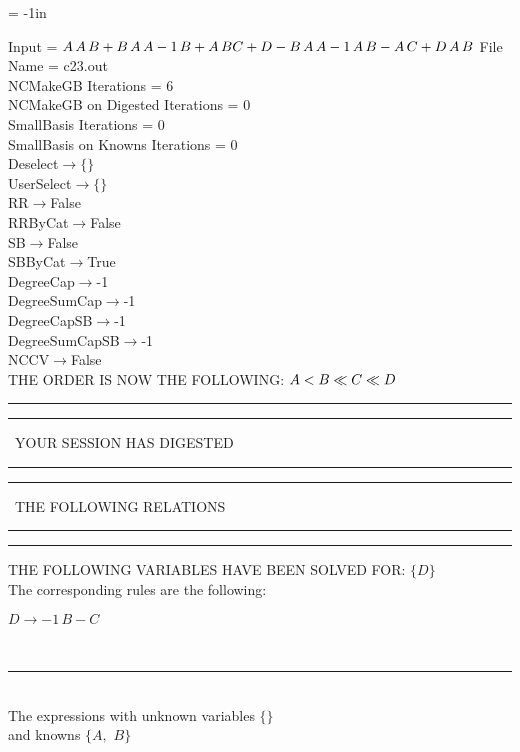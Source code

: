 \voffset = -1in
\evensidemargin 0.1in
\oddsidemargin 0.1in
\textheight 9in
\textwidth 6in

\normalsize
\baselineskip=12pt
\noindent
Input = 
$
\\A\,
 A\,
 B + B\,
 A\,
 A\\
-1\,
 B + A\,
 B\\
C + D - B\,
 A\,
 A\\
-1\,
 A\,
 B - A\,
 C + D\,
 A\,
 B\\
$
File Name = c23.out\\
NCMakeGB Iterations = 6\\
NCMakeGB on Digested Iterations = 0\\
SmallBasis Iterations = 0\\
SmallBasis on Knowns Iterations = 0\\
Deselect$\rightarrow \{\}$\\
UserSelect$\rightarrow \{\}$\\
RR$\rightarrow $False\\
RRByCat$\rightarrow $False\\
SB$\rightarrow $False\\
SBByCat$\rightarrow $True\\
DegreeCap$\rightarrow $-1\\
DegreeSumCap$\rightarrow $-1\\
DegreeCapSB$\rightarrow $-1\\
DegreeSumCapSB$\rightarrow $-1\\
NCCV$\rightarrow $False\\
THE ORDER IS NOW THE FOLLOWING:\hfil\break
$
A<B\ll
C\ll
D\\
$
\rule[2pt]{6in}{4pt}\hfil\break
\rule[2pt]{1.879in}{4pt}
\ YOUR SESSION HAS DIGESTED\ 
\rule[2pt]{1.879in}{4pt}\hfil\break
\rule[2pt]{1.923in}{4pt}
\ THE FOLLOWING RELATIONS\ 
\rule[2pt]{1.923in}{4pt}\hfil\break
\rule[2pt]{6in}{4pt}\hfil\break
THE FOLLOWING VARIABLES HAVE BEEN SOLVED FOR:\hfil\break
$\{D\}$
\smallskip\\
The corresponding rules are the following:\smallskip\\
\begin{minipage}{6in}
$
D\rightarrow -1\,
 B - C
$
\end{minipage}\medskip\\
\rule[3pt]{6in}{.7pt}\\
The expressions with unknown variables $\{\}$\\
and knowns $\{A,
$ $
B\}$\smallskip\\
